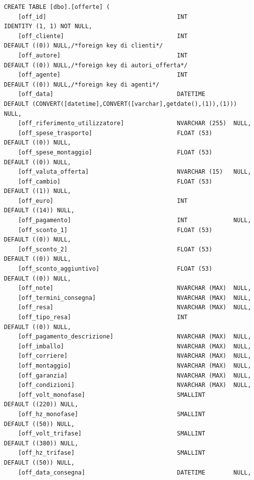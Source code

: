 \documentclass[12pt]{article}
\begin{document}
\begin{lstlisting}
CREATE TABLE [dbo].[offerte] (
    [off_id]                                     INT             IDENTITY (1, 1) NOT NULL,
    [off_cliente]                                INT             DEFAULT ((0)) NULL,/*foreign key di clienti*/
    [off_autore]                                 INT             DEFAULT ((0)) NULL,/*foreign key di autori_offerta*/
    [off_agente]                                 INT             DEFAULT ((0)) NULL,/*foreign key di agenti*/
    [off_data]                                   DATETIME        DEFAULT (CONVERT([datetime],CONVERT([varchar],getdate(),(1)),(1))) NULL,
    [off_riferimento_utilizzatore]               NVARCHAR (255)  NULL,
    [off_spese_trasporto]                        FLOAT (53)      DEFAULT ((0)) NULL,
    [off_spese_montaggio]                        FLOAT (53)      DEFAULT ((0)) NULL,
    [off_valuta_offerta]                         NVARCHAR (15)   NULL,
    [off_cambio]                                 FLOAT (53)      DEFAULT ((1)) NULL,
    [off_euro]                                   INT             DEFAULT ((14)) NULL,
    [off_pagamento]                              INT             NULL,
    [off_sconto_1]                               FLOAT (53)      DEFAULT ((0)) NULL,
    [off_sconto_2]                               FLOAT (53)      DEFAULT ((0)) NULL,
    [off_sconto_aggiuntivo]                      FLOAT (53)      DEFAULT ((0)) NULL,
    [off_note]                                   NVARCHAR (MAX)  NULL,
    [off_termini_consegna]                       NVARCHAR (MAX)  NULL,
    [off_resa]                                   NVARCHAR (MAX)  NULL,
    [off_tipo_resa]                              INT             DEFAULT ((0)) NULL,
    [off_pagamento_descrizione]                  NVARCHAR (MAX)  NULL,
    [off_imballo]                                NVARCHAR (MAX)  NULL,
    [off_corriere]                               NVARCHAR (MAX)  NULL,
    [off_montaggio]                              NVARCHAR (MAX)  NULL,
    [off_garanzia]                               NVARCHAR (MAX)  NULL,
    [off_condizioni]                             NVARCHAR (MAX)  NULL,
    [off_volt_monofase]                          SMALLINT        DEFAULT ((220)) NULL,
    [off_hz_monofase]                            SMALLINT        DEFAULT ((50)) NULL,
    [off_volt_trifase]                           SMALLINT        DEFAULT ((380)) NULL,
    [off_hz_trifase]                             SMALLINT        DEFAULT ((50)) NULL,
    [off_data_consegna]                          DATETIME        NULL,

\end{lstlisting}
\end{document}

